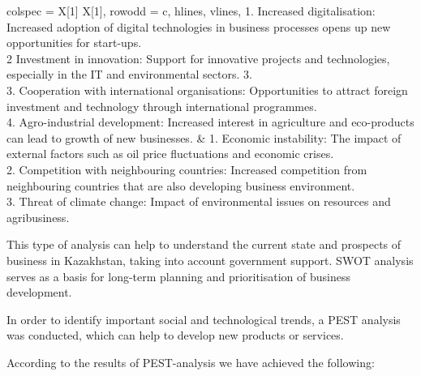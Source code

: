\begin{table}[H]
\begin{tblr}{
  colspec = {X[1] X[1]},
  row{odd} = {c},
  hlines,
  vlines,
}
{\small 1. Increased digitalisation: Increased adoption of digital technologies in business processes opens up new opportunities for start-ups.\\2 Investment in innovation: Support for innovative projects and technologies, especially in the IT and environmental sectors. 3.\\3. Cooperation with international organisations: Opportunities to attract foreign investment and technology through international programmes.\\4. Agro-industrial development: Increased interest in agriculture and eco-products can lead to growth of new businesses.} & {\small 1. Economic instability: The impact of external factors such as oil price fluctuations and economic crises.\\2. Competition with neighbouring countries: Increased competition from neighbouring countries that are also developing business environment.\\3. Threat of climate change: Impact of environmental issues on resources and agribusiness.}                                                                  
\end{tblr}
\end{table}

\begin{multicols}{2}
This type of analysis can help to understand the current state and
prospects of business in Kazakhstan, taking into account government
support. SWOT analysis serves as a basis for long-term planning and
prioritisation of business development.

In order to identify important social and technological trends, a PEST
analysis was conducted, which can help to develop new products or
services.

According to the results of PEST-analysis we have achieved the
following:
\end{multicols}

